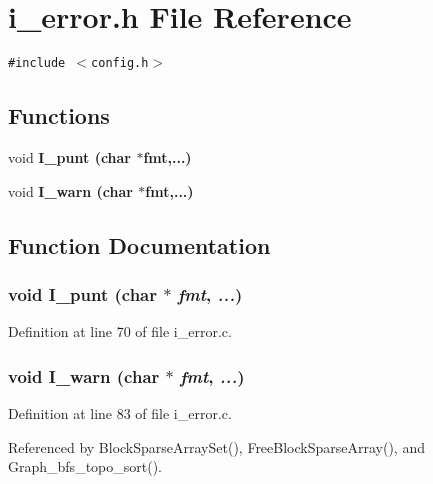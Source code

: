 \section{i\_\-error.h File Reference}
\label{i__error_8h}
{\tt \#include $<$config.h$>$}\par
\subsection*{Functions}
\begin{CompactItemize}
\item 
void \bf{I\_\-punt} (char $\ast$fmt,...)
\item 
void \bf{I\_\-warn} (char $\ast$fmt,...)
\end{CompactItemize}


\subsection{Function Documentation}
\subsubsection{\setlength{\rightskip}{0pt plus 5cm}void I\_\-punt (char $\ast$ {\em fmt},  {\em ...})}\label{i__error_8h_04f215f17936ffe11d70fef75a9f2185}




Definition at line 70 of file i\_\-error.c.
\subsubsection{\setlength{\rightskip}{0pt plus 5cm}void I\_\-warn (char $\ast$ {\em fmt},  {\em ...})}\label{i__error_8h_c0138045492af6457622579cfe270c7f}




Definition at line 83 of file i\_\-error.c.

Referenced by Block\-Sparse\-Array\-Set(), Free\-Block\-Sparse\-Array(), and Graph\_\-bfs\_\-topo\_\-sort().